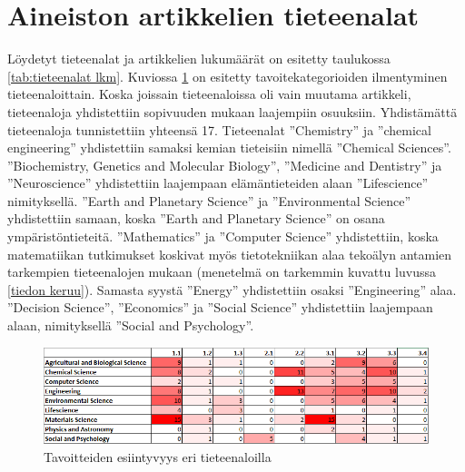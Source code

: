 \documentclass[utf8]{gradu3}
\begin{document}
\section{Aineiston artikkelien tieteenalat} \label{tieteenalat}
Löydetyt tieteenalat ja artikkelien lukumäärät on esitetty taulukossa 
\ref{tab:tieteenalat lkm}. Kuviossa \ref{fig:heatmap_v1} on esitetty
tavoitekategorioiden ilmentyminen tieteenaloittain.
Koska joissain tieteenaloissa oli vain muutama artikkeli, 
tieteenaloja yhdistettiin sopivuuden mukaan laajempiin osuuksiin.
Yhdistämättä tieteenaloja tunnistettiin yhteensä 17.
Tieteenalat ''Chemistry'' ja ''chemical engineering'' yhdistettiin 
samaksi kemian tieteisiin nimellä ''Chemical Sciences''.
''Biochemistry, Genetics and Molecular Biology'', ''Medicine and Dentistry'' ja ''Neuroscience''
yhdistettiin laajempaan elämäntieteiden alaan ''Lifescience'' nimityksellä.
''Earth and Planetary Science'' ja ''Environmental Science'' yhdistettiin samaan, 
koska ''Earth and Planetary Science'' on osana ympäristöntieteitä.
''Mathematics'' ja ''Computer Science'' yhdistettiin, 
koska matematiikan tutkimukset koskivat myös tietotekniikan alaa tekoälyn 
antamien tarkempien tieteenalojen mukaan 
(menetelmä on tarkemmin kuvattu luvussa \ref{tiedon keruu}).
Samasta syystä ''Energy'' yhdistettiin osaksi ''Engineering'' alaa.
''Decision Science'', ''Economics'' ja ''Social Science'' yhdistettiin laajempaan alaan,
nimityksellä ''Social and Psychology''.

\begin{figure}[ht]
    \centering
    \includegraphics[width=1.0\linewidth]{Heatmap_v4.PNG}
    \caption{Tavoitteiden esiintyvyys eri tieteenaloilla}
    \label{fig:heatmap_v1}
\end{figure}
\end{document}
